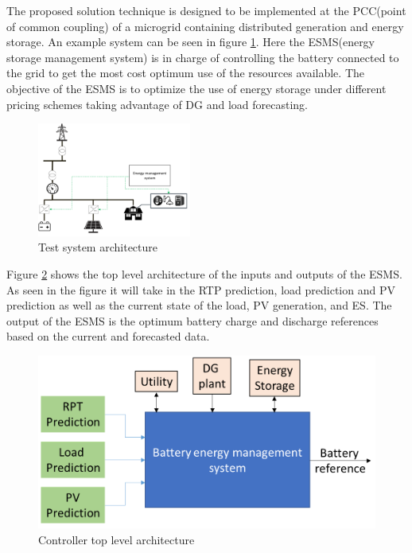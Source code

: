 The proposed solution technique is designed to be implemented at the PCC(point of common coupling) of a microgrid containing distributed generation and energy storage. An example system can be seen in figure \ref{fig:system_arch}. Here the ESMS(energy storage management system) is in charge of controlling the battery connected to the grid to get the most cost optimum use of the resources available. The objective of the ESMS is to optimize the use of energy storage under different pricing schemes taking advantage of DG and load forecasting.
\begin{figure}[!htbp]
\centering
\includegraphics[width=0.45\textwidth]{figs/System_architecture.png}
\caption{Test system architecture}
\label{fig:system_arch}
\vspace{-3mm}
\end{figure}

 Figure \ref{fig:F1_CA} shows the top level architecture of the inputs and outputs of the ESMS. As seen in the figure it will take in the RTP prediction, load prediction and PV prediction as well as the current state of the load, PV generation, and ES. The output of the ESMS is the optimum battery charge and discharge references based on the current and forecasted data.

\begin{figure}[!ht]
    \centering
    \includegraphics[width = \linewidth]{figs/EMS_FIG.png}
    \caption{Controller top level architecture}
    \label{fig:F1_CA}
\end{figure}

